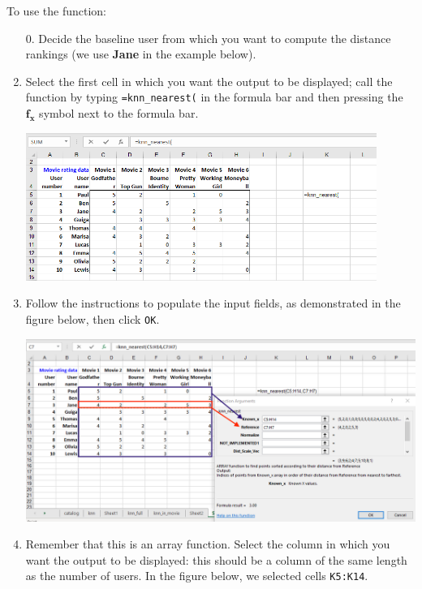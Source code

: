 \documentclass[12pt]{article}
\begin{document}
To use the function:
\begin{enumerate}
\item[0.] Decide the baseline user from which you want to compute the distance rankings (we use \textbf{Jane} in the example below).
\item Select the first cell in which you want the output to be displayed; call the function by typing \texttt{=knn\_nearest(} in the formula bar and then pressing the $\boldsymbol{f_x}$ symbol next to the formula bar.

\medskip

\centerline{\includegraphics[width=4.5in]{figures/knnnearest1}}

\medskip

\item Follow the instructions to populate the input fields, as demonstrated in the figure below, then click \texttt{OK}.

\medskip

\centerline{\includegraphics[width=5.5in]{figures/knnnearest2}}

\medskip

\item Remember that this is an array function. Select the column in which you want the output to be displayed: this should be a column of the same length as the number of users. In the figure below, we selected cells \texttt{K5:K14}.

\medskip


\end{enumerate}
\end{document}
